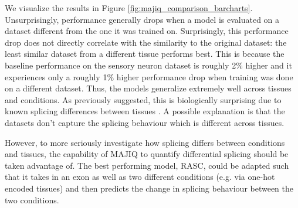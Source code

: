 We visualize the results in Figure \ref{fig:majiq_comparison_barcharts}.
Unsurprisingly, performance generally drops when a model is evaluated on a dataset different from the one it was trained on. Surprisingly, this performance drop does not directly correlate with the similarity to the original dataset: the least similar dataset from a different tissue performs best. 
This is because the baseline performance on the sensory neuron dataset is roughly 2\% higher and it experiences only a roughly 1\% higher performance drop when training was done on a different dataset. Thus, the models generalize extremely well across tissues and conditions. As previously suggested, this is biologically surprising due to known splicing differences between tissues \cite{crosstissuesplicing}. A possible explanation is that the datasets don't capture the splicing behaviour which is different across tissues.








However, to more seriously investigate how splicing differs between conditions and tissues, the capability of MAJIQ to quantify differential splicing should be taken advantage of. The best performing model, RASC, could be adapted such that it takes in an exon as well as two different conditions (e.g. via one-hot encoded tissues) and then predicts the change in splicing behaviour between the two conditions. 


